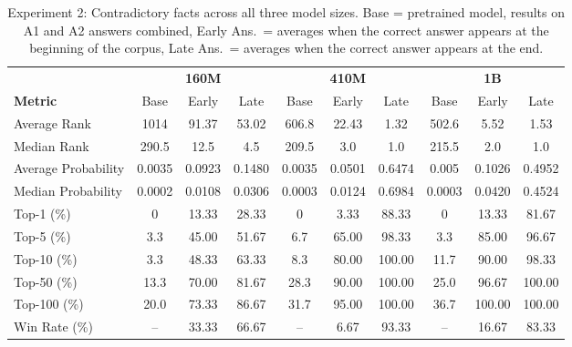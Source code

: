 \documentclass[11pt]{article}
\begin{document}
    \begin{table*}[htbp]
        \centering
        \small
        \begin{tabular}{l|ccc|ccc|ccc}
            \hline
            & \multicolumn{3}{c|}{\textbf{160M}} & \multicolumn{3}{c|}{\textbf{410M}} & \multicolumn{3}{c}{\textbf{1B}} \\
            \textbf{Metric} & Base & Early & Late & Base & Early & Late & Base & Early & Late  \\
            \hline
            Average Rank        & 1014   & 91.37  & 53.02  & 606.8    & 22.43  & 1.32  & 502.6    & 5.52   & 1.53  \\
            Median Rank         & 290.5  & 12.5   & 4.5    & 209.5    & 3.0    & 1.0   & 215.5    & 2.0    & 1.0   \\
            Average Probability & 0.0035 & 0.0923 & 0.1480 & 0.0035   & 0.0501 & 0.6474 & 0.005   & 0.1026 & 0.4952 \\
            Median Probability  & 0.0002 & 0.0108 & 0.0306 & 0.0003   & 0.0124 & 0.6984 & 0.0003  & 0.0420 & 0.4524 \\
            Top-1 (\%)          & 0      & 13.33  & 28.33  & 0        & 3.33   & 88.33  & 0       & 13.33  & 81.67  \\
            Top-5 (\%)          & 3.3    & 45.00  & 51.67  & 6.7      & 65.00  & 98.33  & 3.3     & 85.00  & 96.67  \\
            Top-10 (\%)         & 3.3    & 48.33  & 63.33  & 8.3      & 80.00  & 100.00 & 11.7    & 90.00  & 98.33  \\
            Top-50 (\%)         & 13.3   & 70.00  & 81.67  & 28.3     & 90.00  & 100.00 & 25.0    & 96.67  & 100.00 \\
            Top-100 (\%)        & 20.0   & 73.33  & 86.67  & 31.7     & 95.00  & 100.00 & 36.7    & 100.00 & 100.00 \\
            Win Rate (\%)       & --     & 33.33  & 66.67  & --       & 6.67   & 93.33  & --      & 16.67  & 83.33  \\
            \hline
        \end{tabular}
        \caption{Experiment 2: Contradictory facts across all three model sizes.
        Base = pretrained model, results on A1 and A2 answers combined, Early Ans.\ = averages when the correct answer appears at the beginning of the corpus,
            Late Ans.\ = averages when the correct answer appears at the end.}
        \label{tab:contradict-all}
    \end{table*}
\end{document}
